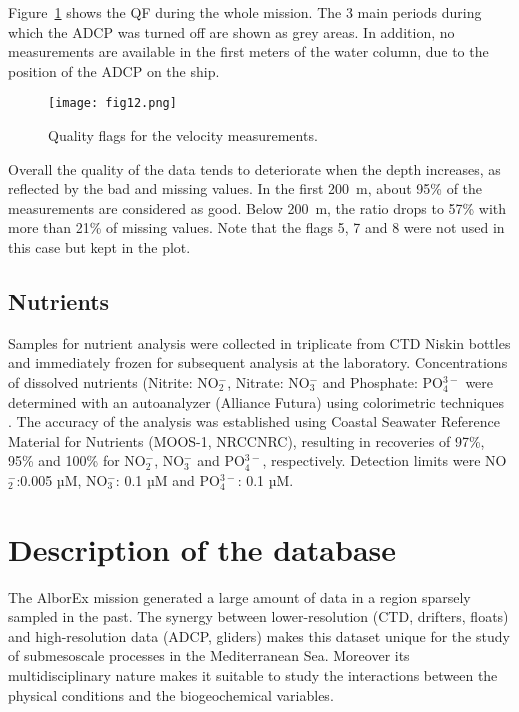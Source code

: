 \documentclass[essd,manuscript]{copernicus}
\begin{document}
Figure~\ref{fig9b:adcpQC} shows the QF during the whole mission. The 3 main periods during which the ADCP was turned off are shown as grey areas. In addition, no measurements are available in the first meters of the water column, due to the position of the ADCP on the ship.

\begin{figure}[ht]
\texttt{[image: fig12.png]}
\caption{Quality flags for the velocity measurements.\label{fig9b:adcpQC}}
\end{figure}

Overall the quality of the data tends to deteriorate when the depth increases, as reflected by the bad and missing values. In the first 200~m, about 95\% of the measurements are considered as good. Below 200~m, the ratio drops to 57\% with more than 21\% of missing values. Note that the flags 5, 7 and 8 were not used in this case but kept in the plot.

\subsection{Nutrients}

Samples for nutrient analysis were collected in triplicate from CTD Niskin bottles and immediately frozen for subsequent analysis at the laboratory. Concentrations of dissolved nutrients (Nitrite: NO$_{2}^{-}$, Nitrate: NO$_{3}^{-}$ and Phosphate: PO$_{4}^{3-}$ were determined with an autoanalyzer (Alliance Futura) using colorimetric techniques \citep{GRASSHOFF1983}. The accuracy of the analysis was established using Coastal Seawater Reference Material for Nutrients (MOOS-1, NRCCNRC), resulting in recoveries of 97\%, 95\% and 100\% for NO$_{2}^{-}$, NO$_{3}^{-}$ and PO$_{4}^{3-}$, respectively. Detection limits were NO$_{2}^{-}$:0.005 µM, NO$_{3}^{-}$: 0.1 µM and PO$_{4}^{3-}$: 0.1 µM.


\section{Description of the database\label{sec:database}}

The AlborEx mission generated a large amount of data in a region sparsely sampled in the past. The synergy between lower-resolution (CTD, drifters, floats) and high-resolution data (ADCP, gliders) makes this dataset unique for the study of submesoscale processes in the Mediterranean Sea. Moreover its multidisciplinary nature makes it suitable to study the interactions between the physical conditions and the biogeochemical variables.
\end{document}
